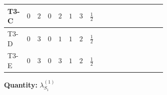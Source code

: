 \documentclass[8pt]{article}
\begin{document}
\begin{landscape}
\begin{longtable}{@{}llcccccc >{\raggedright\arraybackslash}p{0.21\linewidth} >{\raggedright\arraybackslash}p{0.21\linewidth} >{\raggedright\arraybackslash}p{0.21\linewidth}@{}}
\midrule
T3-C & $0$ & $2$ & $0$ & $2$ & $1$ & $3$ & $\frac{1}{2}$ & \scriptsize\adjustbox{max width=\linewidth}{$\begin{gathered} +4 {\lambda_{12}^{(1)}}^2\end{gathered}$} & \scriptsize\adjustbox{max width=\linewidth}{$\begin{gathered} +4 {\lambda_{HS_1}^{(1)}}^2\end{gathered}$} & \scriptsize\adjustbox{max width=\linewidth}{$\begin{gathered} +12 {\lambda_{S_1}^{(1)}}^2\end{gathered}$} \\
\midrule
T3-D & $0$ & $3$ & $0$ & $1$ & $1$ & $2$ & $\frac{1}{2}$ & \scriptsize\adjustbox{max width=\linewidth}{$\begin{gathered} +2 {\lambda_{12}^{(1)}}^2\end{gathered}$} & \scriptsize\adjustbox{max width=\linewidth}{$\begin{gathered} +4 {\lambda_{HS_1}^{(1)}}^2\end{gathered}$} & \scriptsize\adjustbox{max width=\linewidth}{$\begin{gathered} +14 {\lambda_{S_1}^{(1)}}^2\end{gathered}$} \\
\midrule
T3-E & $0$ & $3$ & $0$ & $3$ & $1$ & $2$ & $\frac{1}{2}$ & \scriptsize\adjustbox{max width=\linewidth}{$\begin{gathered} +6 {\lambda_{12}^{(1)}}^2\end{gathered}$} & \scriptsize\adjustbox{max width=\linewidth}{$\begin{gathered} +4 {\lambda_{HS_1}^{(1)}}^2\end{gathered}$} & \scriptsize\adjustbox{max width=\linewidth}{$\begin{gathered} +14 {\lambda_{S_1}^{(1)}}^2\end{gathered}$} \\
\midrule
\bottomrule
\end{longtable}
\clearpage
\noindent\textbf{Quantity: }$\lambda_{S_1}^{(1)}$\par\smallskip

\end{landscape}
\end{document}
